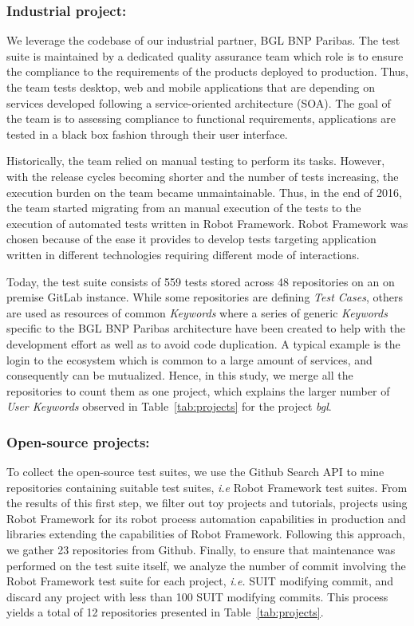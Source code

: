 \subsubsection{Industrial project:}
We leverage the codebase of our industrial partner, BGL BNP Paribas. The test suite is maintained by a dedicated quality assurance team which role is to ensure the compliance to the requirements of the products deployed to production. Thus, the team tests desktop, web and mobile applications that are depending on services developed following a service-oriented architecture (SOA). The goal of the team is to assessing compliance to functional requirements, applications are tested in a black box fashion through their user interface.

Historically, the team relied on manual testing to perform its tasks. However, with the release cycles becoming shorter and the number of tests increasing, the execution burden on the team became unmaintainable. Thus, in the end of 2016, the team started migrating from an manual execution of the tests to the execution of automated tests written in Robot Framework. Robot Framework was chosen because of the ease it provides to develop tests targeting application written in different technologies requiring different mode of interactions.

Today, the test suite consists of 559 tests stored across 48 repositories on an on premise GitLab instance. While some repositories are defining \emph{Test Cases}, others are used as resources of common \emph{Keywords} where a series of generic \emph{Keywords} specific to the BGL BNP Paribas architecture have been created to help with the development effort as well as to avoid code duplication. A typical example is the login to the ecosystem which is common to a large amount of services, and consequently can be mutualized. Hence, in this study, we merge all the repositories to count them as one project, which explains the larger number of \emph{User Keywords} observed in Table~\ref{tab:projects} for the project \emph{bgl}.

\subsubsection{Open-source projects:} 
To collect the open-source test suites, we use the Github Search API to mine repositories containing suitable test suites, \emph{i.e} Robot Framework test suites. From the results of this first step, we filter out toy projects and tutorials, projects using Robot Framework for its robot process automation capabilities in production and libraries extending the capabilities of Robot Framework. Following this approach, we gather 23 repositories from Github. Finally, to ensure that maintenance was performed on the test suite itself, we analyze the number of commit involving the Robot Framework test suite for each project, \emph{i.e.} SUIT modifying commit, and discard any project with less than 100 SUIT modifying commits. This process yields a total of 12 repositories presented in Table~\ref{tab:projects}.

